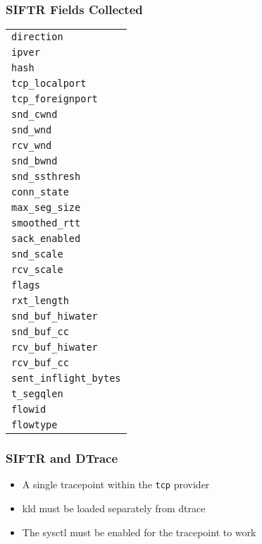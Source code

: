 \documentclass[pdftex]{beamer}
\begin{document}
\begin{frame}[fragile]
  \frametitle{SIFTR Fields Collected}
  \begin{tabular*}{1.0\linewidth}{|l|}
    \verb|direction| \\
    \verb|ipver|  \\
    \verb|hash| \\
    \verb|tcp_localport| \\
    \verb|tcp_foreignport| \\
    \verb|snd_cwnd| \\
    \verb|snd_wnd| \\
    \verb|rcv_wnd| \\
    \verb|snd_bwnd| \\
    \verb|snd_ssthresh| \\
    \verb|conn_state| \\
    \verb|max_seg_size| \\
    \verb|smoothed_rtt | \\
    \verb|sack_enabled| \\
    \verb|snd_scale| \\
    \verb|rcv_scale| \\
    \verb|flags| \\
    \verb|rxt_length| \\
    \verb|snd_buf_hiwater| \\
    \verb|snd_buf_cc| \\
    \verb|rcv_buf_hiwater| \\
    \verb|rcv_buf_cc| \\
    \verb|sent_inflight_bytes| \\
    \verb|t_segqlen| \\
    \verb|flowid| \\
    \verb|flowtype| 
  \end{tabular*}
\end{frame}

\begin{frame}[fragile]
  \frametitle{SIFTR and DTrace}
  \begin{itemize}
  \item A single tracepoint within the \verb|tcp| provider
  \item kld must be loaded separately from dtrace
  \item The sysctl must be enabled for the tracepoint to work
  \end{itemize}
\end{frame}
\end{document}
